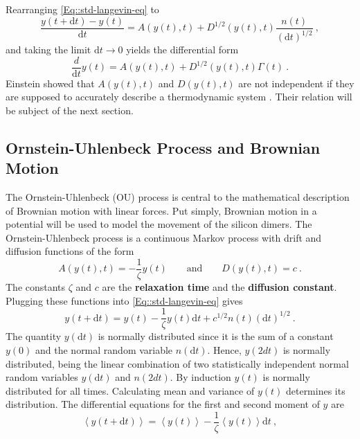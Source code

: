 	Rearranging \autoref{Eq::std-langevin-eq} to
	\begin{equation}
		\frac{y(t + \text{d}t) - y(t)}{\text{d}t} =	A(y(t), t) + D^{1/2} (y(t), t) \frac{n(t)}{(\text{d}t)^{1/2}} ~,
	\end{equation}
	and taking the limit $\text{d}t \rightarrow 0$ yields the differential form
	\begin{equation} \label{Eq::Differential-Langevin-eq}
		\frac{d}{\text{d}t} y(t) =	A(y(t), t) + D^{1/2}(y(t), t) \Gamma(t)~.
	\end{equation}
	 Einstein showed that  $A(y(t), t)$ and $D(y(t), t)$ are not independent if they are supposed to accurately describe a thermodynamic system \cite{einstein1905molekularkinetischen}. Their relation will be subject of the next section.
	
	
	\subsection{Ornstein-Uhlenbeck Process and Brownian Motion} \label{Section::Brownian-Motion}
	The Ornstein-Uhlenbeck (OU) process is central to the mathematical description of Brownian motion with linear forces. Put simply, Brownian motion in a potential will be used to model the movement of the silicon dimers. The Ornstein-Uhlenbeck process is a continuous Markov process with drift and diffusion functions of the form
	\begin{equation}
		A(y(t), t) =	- \frac{1}{\zeta} y(t) \qquad \text{and} \qquad D(y(t), t) =	c~.
	\end{equation}
	The constants $\zeta$ and $c$ are the \textbf{relaxation time} and the \textbf{diffusion constant}. Plugging these functions into \autoref{Eq::std-langevin-eq} gives
	\begin{equation}\label{Eq::OU-Langevin}
		y(t + \text{d}t) =	y(t) - \frac{1}{\zeta} y(t) \text{d}t + c^{1/2} n(t) (\text{d}t)^{1/2}~.
	\end{equation}
	The quantity $y(\text{d}t)$ is normally distributed since it is the sum of a constant $y(0)$ and the normal random variable $n(\text{d}t)$. Hence, $y(2dt)$ is normally distributed, being the linear combination of two statistically independent normal random variables $y(\text{d}t)$ and $n(2dt)$. By induction $y(t)$ is normally distributed for all times. Calculating mean and variance of $y(t)$ determines its distribution.
	The differential equations for the first and second moment of $y$ are
	\begin{equation}
		\left \langle y(t + \text{d}t) \right \rangle =	\left \langle y(t) \right \rangle - \frac{1}{\zeta} \left \langle y(t) \right \rangle \text{d}t~,
	\end{equation}
